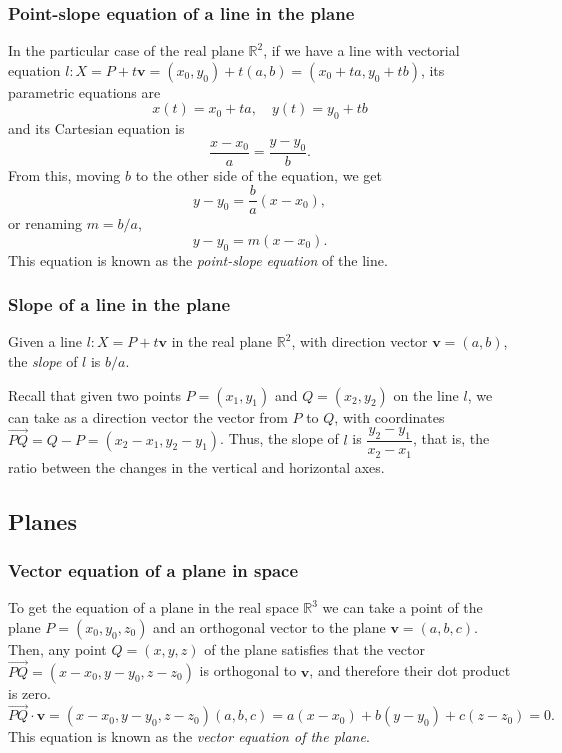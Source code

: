 \begin{frame}
\frametitle{Point-slope equation of a line in the plane}
In the particular case of the real plane $\mathbb{R}^2$, if we have a line with vectorial equation $l: X=P+t\mathbf{v}=(x_0,y_0)+t(a,b)
= (x_0+ta,y_0+tb)$, its parametric equations are
\[
x(t)=x_0+ta,\quad y(t)=y_0+tb
\]
and its Cartesian equation is
\[
\frac{x-x_0}{a} = \frac{y-y_0}{b}.
\]
From this, moving $b$ to the other side of the equation, we get 
\[
y-y_0 = \frac{b}{a}(x-x_0),
\]
or renaming $m=b/a$,
\[
y-y_0=m(x-x_0).
\]
This equation is known as the \emph{point-slope equation} of the line.
\end{frame}


\begin{frame}
\frametitle{Slope of a line in the plane}
\begin{definition}
Given a line $l: X=P+t\mathbf{v}$ in the real plane $\mathbb{R}^2$, with direction vector $\mathbf{v}=(a,b)$, the \emph{slope} of $l$ is $b/a$.
\end{definition}

Recall that given two points $P=(x_1,y_1)$ and $Q=(x_2,y_2)$ on the line $l$, we can take as a direction vector the vector from $P$ to $Q$, with coordinates $\vec{PQ}=Q-P=(x_2-x_1,y_2-y_1)$. 
Thus, the slope of $l$ is $\dfrac{y_2-y_1}{x_2-x_1}$, that is, the ratio between the changes in the vertical and horizontal axes.
\begin{center}

\end{center}
\end{frame}



\subsection{Planes}
\begin{frame}
\frametitle{Vector equation of a plane in space}
To get the equation of a plane in the real space $\mathbb{R}^3$ we can take a point of the plane $P=(x_0,y_0,z_0)$ and an orthogonal vector to the plane $\mathbf{v}=(a,b,c)$.
Then, any point $Q=(x,y,z)$ of the plane satisfies that the vector $\vec{PQ} = (x-x_0,y-y_0,z-z_0)$ is orthogonal to $\mathbf{v}$, and therefore their dot product is zero. 
\[
\vec{PQ}\cdot\mathbf{v} = (x-x_0,y-y_0,z-z_0)(a,b,c) = a(x-x_0)+b(y-y_0)+c(z-z_0) = 0.
\]
This equation is known as the \emph{vector equation of the plane}.

\begin{center}

\end{center}
\end{frame}


